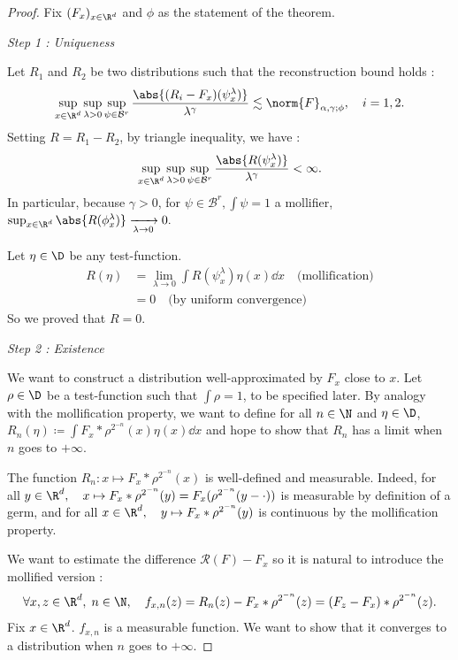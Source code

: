 \begin{proof}
    Fix $(F_x)_{x\in \R^d}$ and $\phi$ as the statement of the theorem.

\textit{Step 1 : Uniqueness}

Let $R_1$ and $R_2$ be two distributions such that the reconstruction bound holds :
\begin{equation*}
        \sup_{x\in \R^d} \sup_{\lambda > 0} \sup_{\psi \in \mathcal{B}^r} \frac{\abs{(R_i-F_x)(\psi_x^\lambda)}}{\lambda^\gamma} \lesssim \norm{F}_{\alpha,\gamma;\phi}, \quad i=1,2.
\end{equation*}
Setting $R = R_1 - R_2$, by triangle inequality, we have :
\begin{equation*}
        \sup_{x\in \R^d} \sup_{\lambda > 0} \sup_{\psi \in \mathcal{B}^r} \frac{\abs{R(\psi_x^\lambda)}}{\lambda^\gamma} <\infty .
\end{equation*}
In particular, because $\gamma>0$, for $\psi \in \mathcal{B}^r, \int \psi = 1$ a mollifier, $\sup_{x\in \R^d} \abs{R(\phi_x^\lambda)}\xrightarrow[\lambda \to 0]{} 0.$

Let $\eta \in \D$ be any test-function.
\begin{align*}
    R(\eta) &= \lim_{\lambda \to 0} \int R(\psi^\lambda_x) \eta(x) \dd x \quad \text{(mollification)}\\
    &=0 \quad \text{(by uniform convergence)}
\end{align*}
So we proved that $R=0$.

\textit{Step 2 : Existence}

We want to construct a distribution well-approximated by $F_x$ close to $x$. Let $\rho \in \D$ be a test-function such that $\int \rho =1$, to be specified later.
By analogy with the mollification property, we want to define for all $n\in \N$ and $\eta \in \D$, $R_n (\eta) \coloneq \int F_x * \rho^{2^{-n}}(x)\eta(x) \dd x$ and hope to show that $R_n$ has a limit when $n$ goes to $+\infty$.

The function $R_n : x\mapsto F_x * \rho^{2^{-n}}(x)$ is well-defined and measurable. Indeed, for all $y\in \R^d, \quad x \mapsto F_x*\rho^{2^{-n}}(y) =F_x(\rho^{2^{-n}}(y - \cdot)) $ is measurable by definition of a germ, and for all $x\in \R^d, \quad y\mapsto F_x*\rho^{2^{-n}}(y)$ is continuous by the mollification property.

We want to estimate the difference $\mathcal{R}(F) - F_x$ so it is natural to introduce the mollified version : 
\begin{equation*}
    \forall x,z \in \R^d,\;n\in \N, \quad f_{x,n} (z) = R_n(z) - F_x*\rho^{2^{-n}}(z) = (F_z - F_x)*\rho^{2^{-n}}(z).
\end{equation*}
Fix $x\in \R^d$. $f_{x,n}$ is a measurable function. We want to show that it converges to a distribution when $n$ goes to $+\infty$.


\end{proof}
